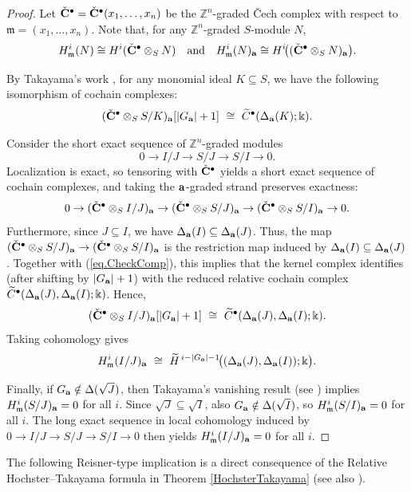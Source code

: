 \documentclass[12pt]{amsart}
\numberwithin{equation}{section}
\theoremstyle{definition}
\theoremstyle{definition}
\newcommand{\ZZ}{{\mathbb Z}}
\def\kk{{\Bbbk}}
\def\mm{{\mathfrak m}}
\def\a{{\bold a}}
\begin{document}
\begin{proof}
	Let $\Check{\bf C}^\bullet=\Check{\bf C}^\bullet(x_1,\dots,x_n)$ be the $\ZZ^n$-graded \v{C}ech complex with respect to
	$\mm=(x_1,\dots,x_n)$. 
	Note that, for any $\ZZ^n$-graded $S$-module $N$,
	\[
	H^i_{\mm}(N)\cong H^i(\Check{\bf C}^\bullet\otimes_S N)
	\quad\text{and}\quad
	H^i_{\mm}(N)_\a\cong H^i\!\big((\Check{\bf C}^\bullet\otimes_S N)_\a\big).
	\]
	
	By Takayama's work \cite{T2005}, for any monomial ideal $K \subseteq S$, we have the following isomorphism of cochain complexes:
	\begin{align}
	(\Check{\bf C}^\bullet\otimes_S S/K)_\a[|G_\a|+1]\ \cong\ \widetilde C^\bullet(\Delta_\a(K);\kk).\label{eq.CheckComp}
	\end{align}

	Consider the short exact sequence of $\ZZ^n$-graded modules
	\[
	0\to I/J\to S/J\to S/I\to 0.
	\]
	Localization is exact, so tensoring with $\Check{\bf C}^\bullet$ yields a short exact sequence of cochain complexes,
	and taking the $\a$-graded strand preserves exactness:
	\[
	0\to (\Check{\bf C}^\bullet\otimes_S I/J)_\a \to (\Check{\bf C}^\bullet\otimes_S S/J)_\a
	\to (\Check{\bf C}^\bullet\otimes_S S/I)_\a \to 0.
	\]
	Furthermore, since $J\subseteq I$, we have $\Delta_\a(I)\subseteq \Delta_\a(J)$. Thus, the map
	$(\Check{\bf C}^\bullet\otimes_S S/J)_\a\to(\Check{\bf C}^\bullet\otimes_S S/I)_\a$
	is the restriction map induced by $\Delta_\a(I)\subseteq\Delta_\a(J)$.
	Together with (\ref{eq.CheckComp}), this implies that the kernel complex identifies (after shifting by $|G_\a|+1$) with the reduced relative cochain complex
	$\widetilde C^\bullet(\Delta_\a(J),\Delta_\a(I);\kk)$. Hence,
	\[
	(\Check{\bf C}^\bullet\otimes_S I/J)_\a[|G_\a|+1]\ \cong\ \widetilde C^\bullet(\Delta_\a(J),\Delta_\a(I);\kk).
	\]
	Taking cohomology gives
	\[
	H^i_{\mm}(I/J)_\a \ \cong\ \widetilde H^{\,i-|G_\a|-1}\!\big((\Delta_\a(J),\Delta_\a(I));\kk\big).
	\]
	
Finally, if $G_\a\notin\Delta(\sqrt J)$, then Takayama's vanishing result (see \cite{T2005}) implies $H^i_{\mm}(S/J)_\a=0$ for all $i$.
	Since $\sqrt J\subseteq \sqrt I$, also $G_\a\notin\Delta(\sqrt I)$, so $H^i_{\mm}(S/I)_\a=0$ for all $i$.
	The long exact sequence in local cohomology induced by
	$0\to I/J\to S/J\to S/I\to 0$ then yields $H^i_{\mm}(I/J)_\a=0$ for all $i$.
\end{proof}

The following Reisner-type implication is a direct consequence of the Relative Hochster--Takayama formula in Theorem \ref{HochsterTakayama} (see also ). 
\end{document}
